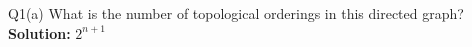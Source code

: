 \begin{problem}
  {Q1(a)}
  What is the number of topological orderings in this directed graph?\\
  \textbf{Solution:} $2^{n+1}$ \\
\end{problem}
